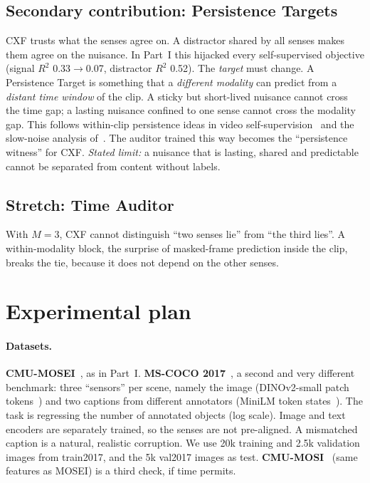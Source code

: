 \documentclass[10pt,twocolumn]{article}
\begin{document}
\subsection{Secondary contribution: Persistence Targets}
CXF trusts what the senses agree on. A distractor shared by all senses makes them agree on the nuisance. In Part~I
this hijacked every self-supervised objective (signal $R^2$ 0.33$\to$0.07, distractor $R^2$ 0.52). The \emph{target}
must change. A Persistence Target is something that a \emph{different modality} can predict from a
\emph{distant time window} of the clip. A sticky but short-lived nuisance cannot cross the time gap; a lasting nuisance
confined to one sense cannot cross the modality gap. This follows within-clip persistence ideas in video
self-supervision~\cite{feichtenhofer2021largescale} and the slow-noise analysis of~\cite{gulati2026contrast}. The
auditor trained this way becomes the ``persistence witness'' for CXF. \emph{Stated limit:} a nuisance that is lasting,
shared and predictable cannot be separated from content without labels.

\subsection{Stretch: Time Auditor}
With $M=3$, CXF cannot distinguish ``two senses lie'' from ``the third lies''. A within-modality block, the surprise of
masked-frame prediction inside the clip, breaks the tie, because it does not depend on the other senses.

\section{Experimental plan}
\paragraph{Datasets.}
\textbf{CMU-MOSEI}~\cite{zadeh2018mosei}, as in Part~I.
\textbf{MS-COCO 2017}~\cite{lin2014coco}, a second and very different benchmark: three ``sensors'' per scene, namely the
image (DINOv2-small patch tokens~\cite{oquab2023dinov2}) and two captions from different annotators (MiniLM token
states~\cite{reimers2019sbert}). The task is regressing the number of annotated objects (log scale). Image and text
encoders are separately trained, so the senses are not pre-aligned. A mismatched caption is a natural, realistic
corruption. We use 20k training and 2.5k validation images from train2017, and the 5k val2017 images as test.
\textbf{CMU-MOSI}~\cite{zadeh2016mosi} (same features as MOSEI) is a third check, if time permits.
\end{document}
